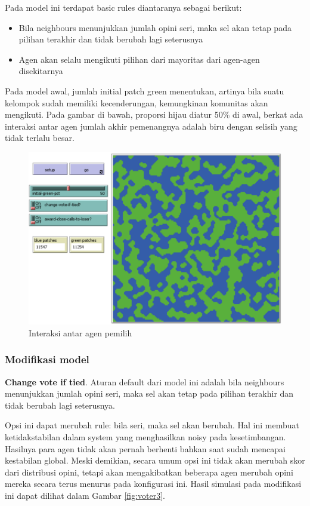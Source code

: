 Pada model ini terdapat basic rules diantaranya sebagai berikut:

\begin{itemize}
	\item Bila neighbours menunjukkan jumlah opini seri, maka sel akan tetap pada pilihan terakhir dan tidak berubah lagi seterusnya

	\item Agen akan selalu mengikuti pilihan dari mayoritas dari agen-agen disekitarnya
\end{itemize}

Pada model awal, jumlah initial patch green menentukan, artinya bila suatu kelompok sudah memiliki kecenderungan, kemungkinan komunitas akan mengikuti. Pada gambar di bawah, proporsi hijau diatur 50\% di awal, berkat ada interaksi antar agen jumlah akhir pemenangnya adalah biru dengan selisih yang tidak terlalu besar.

\begin{figure}[H]
	\centering
	\includegraphics[width=\linewidth]{images/ch03/Voter2}
	\caption{Interaksi antar agen pemilih}
	\label{fig:voter2}
\end{figure}

\subsubsection{Modifikasi model}

\textbf{Change vote if tied}. Aturan default dari model ini adalah bila neighbours menunjukkan jumlah opini seri, maka sel akan tetap pada pilihan terakhir dan tidak berubah lagi seterusnya.

Opsi ini dapat merubah rule: bila seri, maka sel akan berubah. Hal ini membuat ketidakstabilan  dalam system yang menghasilkan noisy pada kesetimbangan. Hasilnya para agen tidak akan pernah berhenti bahkan saat sudah mencapai kestabilan global. Meski demikian, secara umum opsi ini tidak akan merubah skor dari distribusi opini, tetapi akan mengakibatkan beberapa agen merubah opini mereka secara terus menurus pada konfigurasi ini. Hasil simulasi pada modifikasi ini dapat dilihat dalam Gambar \ref{fig:voter3}.


